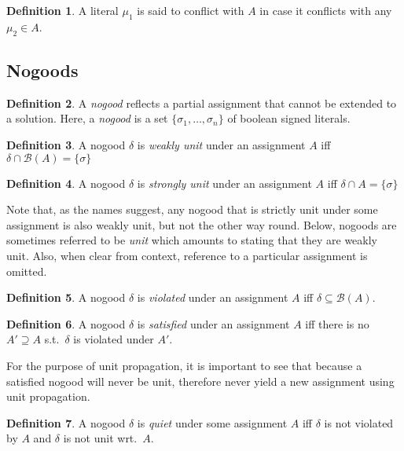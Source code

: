 \documentclass{vutinfth} %
\theoremstyle{example}
\theoremstyle{definition}
\newtheorem{definition}{Definition}[section]
\theoremstyle{theorem}
\theoremstyle{lemma}
\theoremstyle{corollary}
\newcommand{\bass}{\mathcal{B}}
\newcommand{\ass}{A}
\newcommand{\upinv}{quiet\xspace}
\newcommand{\sgl}{\mu}
\newcommand{\bsgl}{\sigma}
\begin{document}
\begin{definition}
A literal $\sgl_1$ is said to conflict with $\ass$ in case it conflicts with any $\sgl_2 \in \ass$.
\end{definition}

\subsection{Nogoods}

\begin{definition}
A \emph{nogood} reflects a partial assignment that cannot be extended to a solution. Here, a \emph{nogood} is a set $\{ \bsgl_1, \ldots, \bsgl_n \}$ of boolean signed literals.
\end{definition}

\begin{definition}
A nogood $\delta$ is \emph{weakly unit} under an assignment $\ass$ iff $\delta \cap \bass(\ass) = \{ \bsgl \}$
\end{definition}

\begin{definition}
A nogood $\delta$ is \emph{strongly unit} under an assignment $\ass$ iff $\delta \cap \ass = \{ \bsgl \}$
\end{definition}

Note that, as the names suggest, any nogood that is strictly unit under some assignment is also weakly unit, but not the other way round. Below, nogoods are sometimes referred to be \emph{unit} which amounts to stating that they are weakly unit. Also, when clear from context, reference to a particular assignment is omitted.

\begin{definition}
A nogood $\delta$ is \emph{violated} under an assignment $\ass$ iff $\delta \subseteq \bass(\ass)$.
\end{definition}

\begin{definition}
A nogood $\delta$ is \emph{satisfied} under an assignment $\ass$ iff there is no $\ass' \supseteq \ass$ s.t.~$\delta$ is violated under $\ass'$.
\end{definition}

For the purpose of unit propagation, it is important to see that because a satisfied nogood will never be unit, therefore never yield a new assignment using unit propagation.

\begin{definition}
A nogood $\delta$ is \emph{\upinv} under some assignment $\ass$ iff $\delta$ is not violated by $\ass$ and $\delta$ is not unit wrt.~$\ass$.
\end{definition}
\end{document}
